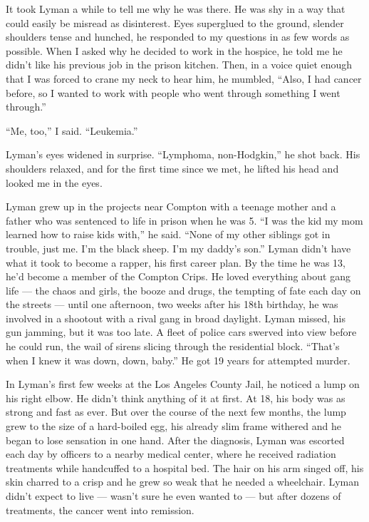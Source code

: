 It took Lyman a while to tell me why he was there. He was shy in a way
that could easily be misread as disinterest. Eyes superglued to the
ground, slender shoulders tense and hunched, he responded to my
questions in as few words as possible. When I asked why he decided to
work in the hospice, he told me he didn't like his previous job in the
prison kitchen. Then, in a voice quiet enough that I was forced to crane
my neck to hear him, he mumbled, ``Also, I had cancer before, so I
wanted to work with people who went through something I went through.''

``Me, too,'' I said. ``Leukemia.''

Lyman's eyes widened in surprise. ``Lymphoma, non-Hodgkin,'' he shot
back. His shoulders relaxed, and for the first time since we met, he
lifted his head and looked me in the eyes.

Lyman grew up in the projects near Compton with a teenage mother and a
father who was sentenced to life in prison when he was 5. ``I was the
kid my mom learned how to raise kids with,'' he said. ``None of my other
siblings got in trouble, just me. I'm the black sheep. I'm my daddy's
son.'' Lyman didn't have what it took to become a rapper, his first
career plan. By the time he was 13, he'd become a member of the Compton
Crips. He loved everything about gang life --- the chaos and girls, the
booze and drugs, the tempting of fate each day on the streets --- until
one afternoon, two weeks after his 18th birthday, he was involved in a
shootout with a rival gang in broad daylight. Lyman missed, his gun
jamming, but it was too late. A fleet of police cars swerved into view
before he could run, the wail of sirens slicing through the residential
block. ``That's when I knew it was down, down, baby.'' He got 19 years
for attempted murder.

In Lyman's first few weeks at the Los Angeles County Jail, he noticed a
lump on his right elbow. He didn't think anything of it at first. At 18,
his body was as strong and fast as ever. But over the course of the next
few months, the lump grew to the size of a hard-boiled egg, his already
slim frame withered and he began to lose sensation in one hand. After
the diagnosis, Lyman was escorted each day by officers to a nearby
medical center, where he received radiation treatments while handcuffed
to a hospital bed. The hair on his arm singed off, his skin charred to a
crisp and he grew so weak that he needed a wheelchair. Lyman didn't
expect to live --- wasn't sure he even wanted to --- but after dozens of
treatments, the cancer went into remission.

